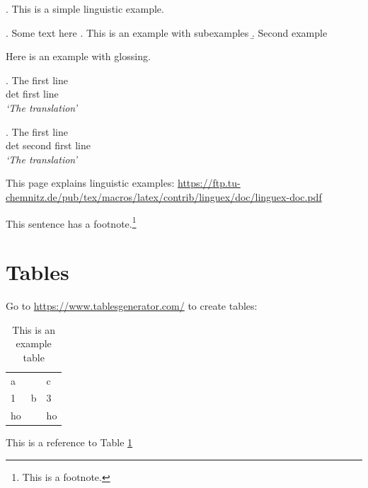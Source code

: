 \ex. \label{ex:intro:ex1} This is a simple linguistic example. 

\ex. Some text here 
\a. This is an example with subexamples
    \b. Second example


Here is an example with glossing.

\exg. The first line \\
    det first line \\
    \trans \textit{`The translation'}

\exg. The first line \\
    det {second first} line \\
    \trans \textit{`The translation'}

    This page explains linguistic examples: \url{https://ftp.tu-chemnitz.de/pub/tex/macros/latex/contrib/linguex/doc/linguex-doc.pdf}

    This sentence has a footnote.\footnote{This is a footnote.}

    \section{Tables}

    Go to \url{https://www.tablesgenerator.com/} to create tables:

    \begin{table}[]
    \centering
\begin{tabular}{l||ll}
a  & \multirow{3}{*}{b} & c  \\
1  &                    & 3  \\
ho &                    & ho
\end{tabular}
\caption{This is an example table}
\label{table:hohoho}
\end{table}

This is a reference to Table \ref{table:hohoho}